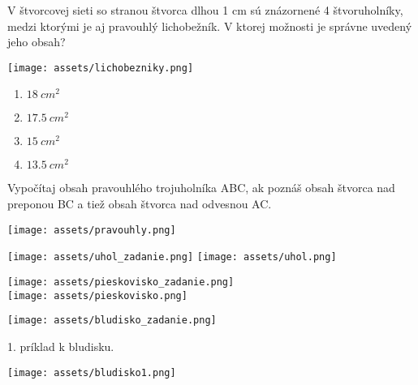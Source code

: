 \begin{example}
	V štvorcovej sieti so stranou štvorca dlhou 1 cm sú znázornené 4 štvoruholníky, medzi ktorými je aj pravouhlý lichobežník. V ktorej možnosti je správne uvedený jeho obsah?
	
	\begin{center}
		\texttt{[image: assets/lichobezniky.png]}
	\end{center}
	
	\begin{enumerate}
		\item $18 ~ cm^2$
		\item $17.5 ~ cm^2$
		\item $15 ~ cm^2$
		\item $13.5 ~ cm^2$
	\end{enumerate}
\end{example}

\begin{example}
	Vypočítaj obsah pravouhlého trojuholníka ABC, ak poznáš obsah štvorca nad preponou BC a tiež obsah štvorca nad odvesnou AC. 
	
	\begin{center}
		\texttt{[image: assets/pravouhly.png]}
	\end{center}
\end{example}

\begin{example}
	\begin{center}
		\texttt{[image: assets/uhol\_zadanie.png]}
		\texttt{[image: assets/uhol.png]}
	\end{center}
\end{example}

\begin{example}
	
	\begin{center}
		\texttt{[image: assets/pieskovisko\_zadanie.png]}\\
		\texttt{[image: assets/pieskovisko.png]}
	\end{center}
\end{example}

\begin{center}
	\texttt{[image: assets/bludisko\_zadanie.png]}
\end{center}

\begin{example}
	1. príklad k bludisku.\\
	\begin{center}
		\texttt{[image: assets/bludisko1.png]}
	\end{center}
\end{example}

